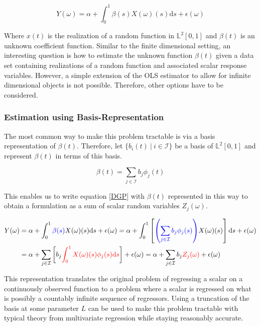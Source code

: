 \documentclass[11pt,twoside,a4paper]{article}
\begin{document}
	\begin{equation}\label{DGP}
		Y(\omega) = \alpha + \int_{0}^{1} \beta(s)X(\omega)(s) \mathrm{d}s + \epsilon(\omega)
	\end{equation}
	
	Where $x(t)$ is the realization of a random function in $\mathbb{L}^2[0,1]$ and $\beta(t)$ is an unknown coefficient function. 
	Similar to the finite dimensional setting, an interesting question is how to estimate the unknown function $\beta(t)$ given a data set containing realizations of a random function and associated scalar response variables. However, a simple extension of the OLS estimator to allow for infinite dimensional objects is not possible. Therefore, other options have to be considered.
	
	\subsubsection{Estimation using Basis-Representation}
	The most common way to make this problem tractable is via a basis representation of $\beta(t)$. Therefore, let $\{b_i(t) \: \vert \: i \in \mathcal{I}\}$ be a basis of $\mathbb{L}^2[0,1]$ and represent $\beta(t)$ in terms of this basis.
	
	\begin{equation}
		\beta(t) = \sum_{j \in \mathcal{I}} b_j \phi_j(t)
	\end{equation}
	
	This enables us to write equation \ref{DGP} with $\beta(t)$ represented in this way to obtain a formulation as a sum of scalar random variables $Z_j(\omega)$.
	
	\begin{equation}
		\begin{split}
			Y(\omega) & = \alpha + \int_{0}^{1} {\color{blue}\beta(s)} X(\omega)(s)\mathrm{d}s + \epsilon(\omega)
			= \alpha + \int_{0}^{1}\left[{\color{blue}\left(\sum_{j \in \mathcal{I}} b_j \phi_j(s)\right)} X(\omega)(s) \right]\mathrm{d}s + \epsilon(\omega) \\
			& = \alpha + \sum_{j \in \mathcal{I}} \left[b_j \textcolor{red}{\int_{0}^{1} X(\omega)(s) \phi_j(s)\mathrm{d}s}\right] + \epsilon(\omega)
		      = \alpha + \sum_{j \in \mathcal{I}} b_j \textcolor{red}{Z_j(\omega)} + \epsilon(\omega)
		\end{split}
	\end{equation}
	
	This representation translates the original problem of regressing a scalar on a continuously observed function to a problem where a scalar is regressed on what is possibly a countably infinite sequence of regressors. Using a truncation of the basis at some parameter $L$ can be used to make this problem tractable with typical theory from multivariate regression while staying reasonably accurate.
	
\end{document}
